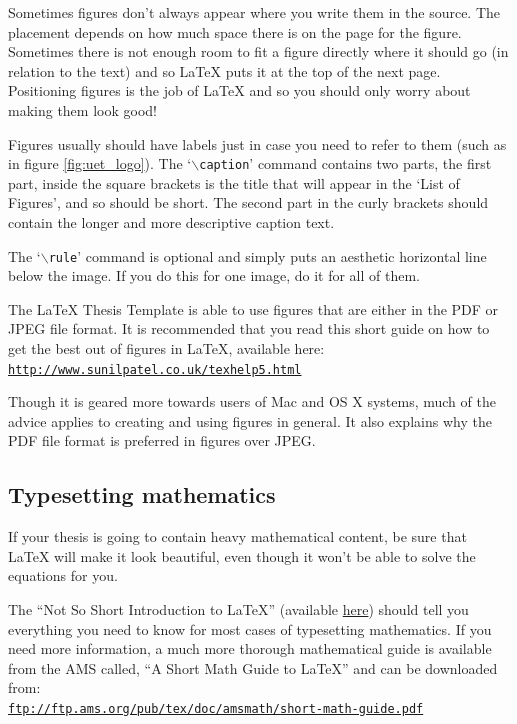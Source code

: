 Sometimes figures don't always appear where you write them in the source. The placement depends on how much space there is on the page for the figure. Sometimes there is not enough room to fit a figure directly where it should go (in relation to the text) and so \LaTeX{} puts it at the top of the next page. Positioning figures is the job of \LaTeX{} and so you should only worry about making them look good!

Figures usually should have labels just in case you need to refer to them (such as in figure \ref{fig:uet_logo}). The `$\backslash$\texttt{caption}' command contains two parts, the first part, inside the square brackets is the title that will appear in the `List of Figures', and so should be short. The second part in the curly brackets should contain the longer and more descriptive caption text.

The `$\backslash$\texttt{rule}' command is optional and simply puts an aesthetic horizontal line below the image. If you do this for one image, do it for all of them.

The \LaTeX{} Thesis Template is able to use figures that are either in the PDF or JPEG file format. It is recommended that you read this short guide on how to get the best out of figures in \LaTeX{}, available here:\\
\href{http://www.sunilpatel.co.uk/texhelp5.html}{\texttt{http://www.sunilpatel.co.uk/texhelp5.html}}

Though it is geared more towards users of Mac and OS X systems, much of the advice applies to creating and using figures in general. It also explains why the PDF file format is preferred in figures over JPEG.

\subsection{Typesetting mathematics}

If your thesis is going to contain heavy mathematical content, be sure that \LaTeX{} will make it look beautiful, even though it won't be able to solve the equations for you.

The ``Not So Short Introduction to \LaTeX{}'' (available \href{http://www.ctan.org/tex-archive/info/lshort/english/lshort.pdf}{here}) should tell you everything you need to know for most cases of typesetting mathematics. If you need more information, a much more thorough mathematical guide is available from the AMS called, ``A Short Math Guide to \LaTeX{}'' and can be downloaded from:\\
\href{ftp://ftp.ams.org/pub/tex/doc/amsmath/short-math-guide.pdf}{\texttt{ftp://ftp.ams.org/pub/tex/doc/amsmath/short-math-guide.pdf}}

